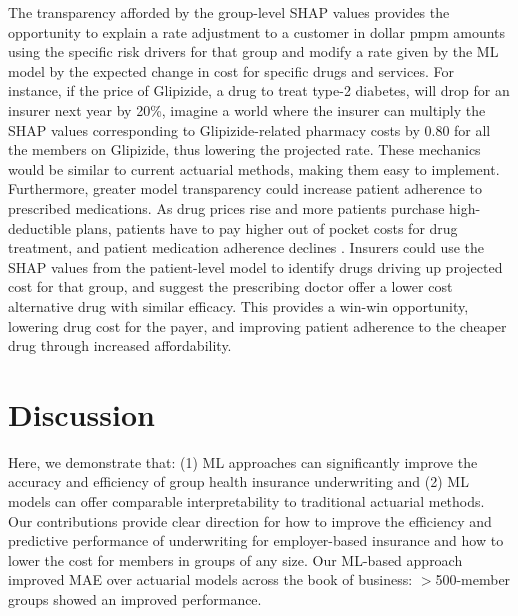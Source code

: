 \documentclass[letterpaper]{article} %
\begin{document}
The transparency afforded by the group-level SHAP values provides the opportunity to explain a rate adjustment to a customer in dollar pmpm amounts using the specific risk drivers for that group and modify a rate given by the ML model by the expected change in cost for specific drugs and services.  For instance, if the price of Glipizide, a drug to treat type-2 diabetes, will drop for an insurer next year by 20\%, imagine a world where the insurer can multiply the SHAP values corresponding to Glipizide-related pharmacy costs by 0.80 for all the members on Glipizide, thus lowering the projected rate.  These mechanics would be similar to current actuarial methods, making them easy to implement. Furthermore, greater model transparency could increase patient adherence to prescribed medications. As drug prices rise and more patients purchase high-deductible plans, patients have to pay higher out of pocket costs for drug treatment, and patient medication adherence declines \cite{DrugCost}. Insurers could use the SHAP values from the patient-level model to identify drugs driving up projected cost for that group, and suggest the prescribing doctor offer a lower cost alternative drug with similar efficacy. This provides a win-win opportunity, lowering drug cost for the payer, and improving patient adherence to the cheaper drug through increased affordability. 


\section*{Discussion}
Here, we demonstrate that: (1) ML approaches can significantly improve the accuracy and efficiency of group health insurance underwriting and (2) ML models can offer comparable interpretability to traditional actuarial methods. Our contributions provide clear direction for how to improve the efficiency and predictive performance of underwriting for employer-based insurance and how to lower the cost for members in groups of any size. Our ML-based approach improved MAE over actuarial models across the book of business: $>$500-member groups showed an improved performance. 
\end{document}
